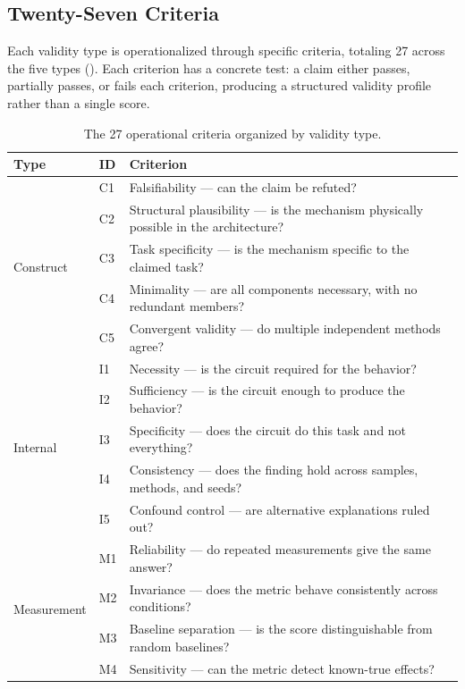 \documentclass[10pt]{article}
\newcommand{\tighttable}{\setlength{\tabcolsep}{4pt}\renewcommand{\arraystretch}{1.05}}
\begin{document}
\subsection{Twenty-Seven Criteria}
\label{sec:criteria}

Each validity type is operationalized through specific criteria, totaling 27 across the five types (). Each criterion has a concrete test: a claim either passes, partially passes, or fails each criterion, producing a structured validity profile rather than a single score.

\begin{table}[t]
\centering
\tighttable
\caption{The 27 operational criteria organized by validity type.}
\label{tab:criteria}
\small
\begin{tabular}{@{}llp{7.5cm}@{}}
\toprule
\textbf{Type} & \textbf{ID} & \textbf{Criterion} \\
\midrule
\multirow{5}{*}{Construct} & C1 & Falsifiability --- can the claim be refuted? \\
& C2 & Structural plausibility --- is the mechanism physically possible in the architecture? \\
& C3 & Task specificity --- is the mechanism specific to the claimed task? \\
& C4 & Minimality --- are all components necessary, with no redundant members? \\
& C5 & Convergent validity --- do multiple independent methods agree? \\
\midrule
\multirow{5}{*}{Internal} & I1 & Necessity --- is the circuit required for the behavior? \\
& I2 & Sufficiency --- is the circuit enough to produce the behavior? \\
& I3 & Specificity --- does the circuit do this task and not everything? \\
& I4 & Consistency --- does the finding hold across samples, methods, and seeds? \\
& I5 & Confound control --- are alternative explanations ruled out? \\
\midrule
\multirow{6}{*}{Measurement} & M1 & Reliability --- do repeated measurements give the same answer? \\
& M2 & Invariance --- does the metric behave consistently across conditions? \\
& M3 & Baseline separation --- is the score distinguishable from random baselines? \\
& M4 & Sensitivity --- can the metric detect known-true effects? \\

\end{tabular}
\end{table}
\end{document}
